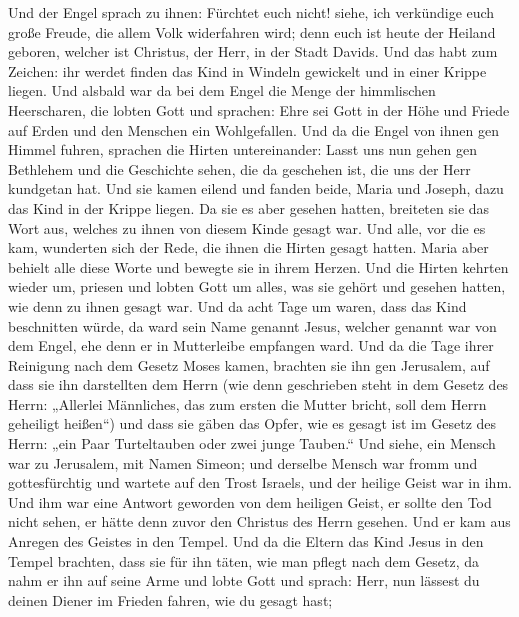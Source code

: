 Und der Engel sprach zu ihnen: Fürchtet euch nicht! siehe, ich
verkündige euch große Freude, die allem Volk widerfahren wird;
 denn euch ist heute der Heiland geboren, welcher ist
Christus, der Herr, in der Stadt Davids.  Und das habt zum
Zeichen: ihr werdet finden das Kind in Windeln gewickelt und in einer
Krippe liegen.  Und alsbald war da bei dem Engel die Menge
der himmlischen Heerscharen, die lobten Gott und sprachen: 
Ehre sei Gott in der Höhe und Friede auf Erden und den Menschen ein
Wohlgefallen.  Und da die Engel von ihnen gen Himmel
fuhren, sprachen die Hirten untereinander: Lasst uns nun gehen gen
Bethlehem und die Geschichte sehen, die da geschehen ist, die uns der
Herr kundgetan hat.  Und sie kamen eilend und fanden beide,
Maria und Joseph, dazu das Kind in der Krippe liegen.  Da
sie es aber gesehen hatten, breiteten sie das Wort aus, welches zu ihnen
von diesem Kinde gesagt war.  Und alle, vor die es kam,
wunderten sich der Rede, die ihnen die Hirten gesagt hatten.
 Maria aber behielt alle diese Worte und bewegte sie in
ihrem Herzen.  Und die Hirten kehrten wieder um, priesen
und lobten Gott um alles, was sie gehört und gesehen hatten, wie denn zu
ihnen gesagt war.  Und da acht Tage um waren, dass das Kind
beschnitten würde, da ward sein Name genannt Jesus, welcher genannt war
von dem Engel, ehe denn er in Mutterleibe empfangen ward. 
Und da die Tage ihrer Reinigung nach dem Gesetz Moses kamen, brachten
sie ihn gen Jerusalem, auf dass sie ihn darstellten dem Herrn
 (wie denn geschrieben steht in dem Gesetz des Herrn:
„Allerlei Männliches, das zum ersten die Mutter bricht, soll dem Herrn
geheiligt heißen``)  und dass sie gäben das Opfer, wie es
gesagt ist im Gesetz des Herrn: „ein Paar Turteltauben oder zwei junge
Tauben.``  Und siehe, ein Mensch war zu Jerusalem, mit
Namen Simeon; und derselbe Mensch war fromm und gottesfürchtig und
wartete auf den Trost Israels, und der heilige Geist war in ihm.
 Und ihm war eine Antwort geworden von dem heiligen Geist,
er sollte den Tod nicht sehen, er hätte denn zuvor den Christus des
Herrn gesehen.  Und er kam aus Anregen des Geistes in den
Tempel. Und da die Eltern das Kind Jesus in den Tempel brachten, dass
sie für ihn täten, wie man pflegt nach dem Gesetz,  da nahm
er ihn auf seine Arme und lobte Gott und sprach:  Herr, nun
lässest du deinen Diener im Frieden fahren, wie du gesagt hast;
